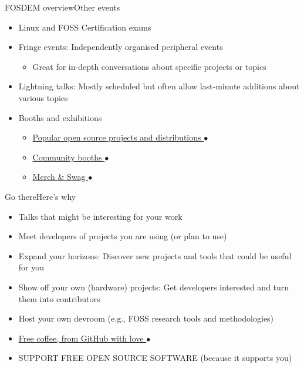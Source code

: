 \documentclass[10pt]{beamer}
\begin{document}
\begin{frame}{FOSDEM overview}{Other events}
    \begin{itemize}
        \item Linux and FOSS Certification exams
        \item Fringe events: Independently organised peripheral events
            \begin{itemize}
                \item Great for in-depth conversations about specific projects or topics
            \end{itemize}
        \item Lightning talks: Mostly scheduled but often allow last-minute additions about various topics
        \item Booths and exhibitions
        \begin{itemize}
            \item \href{./photos/stickers.jpg}{Popular open source projects and distributions $\bullet$}
            \item \href{./photos/booths.jpg}{Community booths $\bullet$}
            \item \href{./photos/merch.jpg}{Merch \& Swag $\bullet$}
        \end{itemize}
    \end{itemize}
\end{frame}

\begin{frame}{Go there}{Here's why}
    \begin{itemize}
        \item Talks that might be interesting for your work
        \item Meet developers of projects you are using (or plan to use)
        \item Expand your horizons: Discover new projects and tools that could be useful for you
        \item Show off your own (hardware) projects: Get developers interested and turn them into contributors
        \item Host your own devroom (e.g., FOSS research tools and methodologies)
        \item \href{./photos/github-coffee.jpg}{Free coffee, from GitHub with love $\bullet$}
        \item SUPPORT FREE OPEN SOURCE SOFTWARE (because it supports you)
    \end{itemize}
\end{frame}
\end{document}
